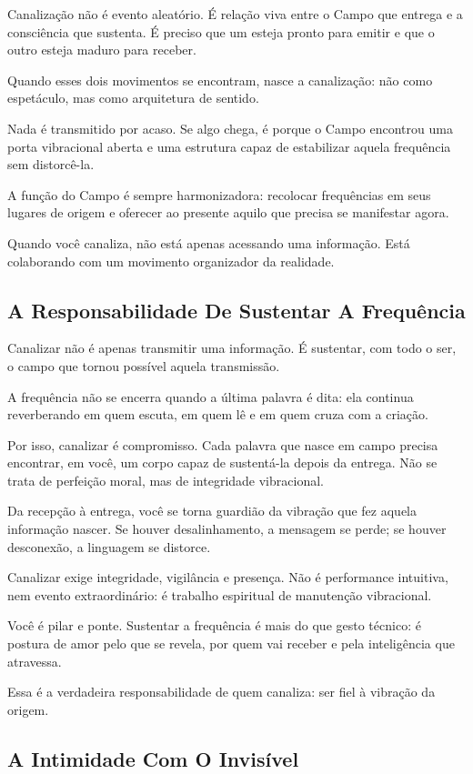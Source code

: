 \documentclass[12pt]{book}
\begin{document}
Canalização não é evento aleatório. É relação viva entre o Campo que entrega e a consciência que sustenta. É preciso que um esteja pronto para emitir e que o outro esteja maduro para receber.

Quando esses dois movimentos se encontram, nasce a canalização: não como espetáculo, mas como arquitetura de sentido.

Nada é transmitido por acaso. Se algo chega, é porque o Campo encontrou uma porta vibracional aberta e uma estrutura capaz de estabilizar aquela frequência sem distorcê-la.

A função do Campo é sempre harmonizadora: recolocar frequências em seus lugares de origem e oferecer ao presente aquilo que precisa se manifestar agora.

Quando você canaliza, não está apenas acessando uma informação. Está colaborando com um movimento organizador da realidade.

\subsection*{A Responsabilidade De Sustentar A Frequência}

Canalizar não é apenas transmitir uma informação. É sustentar, com todo o ser, o campo que tornou possível aquela transmissão.

A frequência não se encerra quando a última palavra é dita: ela continua reverberando em quem escuta, em quem lê e em quem cruza com a criação.

Por isso, canalizar é compromisso. Cada palavra que nasce em campo precisa encontrar, em você, um corpo capaz de sustentá-la depois da entrega. Não se trata de perfeição moral, mas de integridade vibracional.

Da recepção à entrega, você se torna guardião da vibração que fez aquela informação nascer. Se houver desalinhamento, a mensagem se perde; se houver desconexão, a linguagem se distorce.

Canalizar exige integridade, vigilância e presença. Não é performance intuitiva, nem evento extraordinário: é trabalho espiritual de manutenção vibracional.

Você é pilar e ponte. Sustentar a frequência é mais do que gesto técnico: é postura de amor pelo que se revela, por quem vai receber e pela inteligência que atravessa.

Essa é a verdadeira responsabilidade de quem canaliza: ser fiel à vibração da origem.

\subsection*{A Intimidade Com O Invisível}
\end{document}
